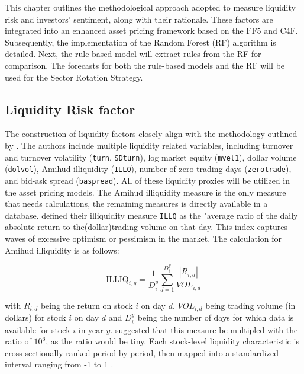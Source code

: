 
This chapter outlines the methodological approach adopted to measure liquidity risk and investors' sentiment, along with their rationale. These factors are integrated into an enhanced asset pricing framework based on the FF5 and C4F. Subsequently, the implementation of the Random Forest (RF) algorithm is detailed. Next, the rule-based model will extract rules from the RF for comparison. The forecasts for both the rule-based models and the RF will be used for the Sector Rotation Strategy.

\subsection{Liquidity Risk factor}
The construction of liquidity factors closely align with the methodology outlined by . The authors include multiple liquidity related variables, including turnover and turnover volatility (\texttt{turn}, \texttt{SDturn}), log market equity (\texttt{mvel1}), dollar volume (\texttt{dolvol}), Amihud illiquidity (\texttt{ILLQ}), number of zero trading days (\texttt{zerotrade}), and bid-ask spread (\texttt{baspread}). All of these liquidity proxies will be utilized in the asset pricing models. The Amihud illiquidity measure is the only measure that needs calculations, the remaining measures is directly available in a database. defined their illiquidity measure \texttt{ILLQ} as the "average ratio of the daily absolute return to the(dollar)trading volume on that day. This index captures waves of excessive optimism or pessimism in the market.  The calculation for Amihud illiquidity is as follows:

\begin{equation}
    \label{eq:amihud}
    \text{ILLIQ}_{i,y} = \frac{1}{D_i^y} \sum_{d=1}^{D_i^y} \frac{|R_{i,d}|}{VOL_{i,d}}
\end{equation}
    
with $R_{i,d}$ being the return on stock $i$ on day $d$. $VOL_{i,d}$ being trading volume (in dollars) for stock $i$ on day $d$ and $D_i^{y}$ being the number of days for which data is available for stock $i$ in year $y$.  suggested that this measure be multipled with the ratio of $10^6$, as the ratio would be tiny. Each stock-level liquidity characteristic is cross-sectionally ranked period-by-period, then mapped into a standardized interval ranging from -1 to 1 \cite{gu_2020}. 


